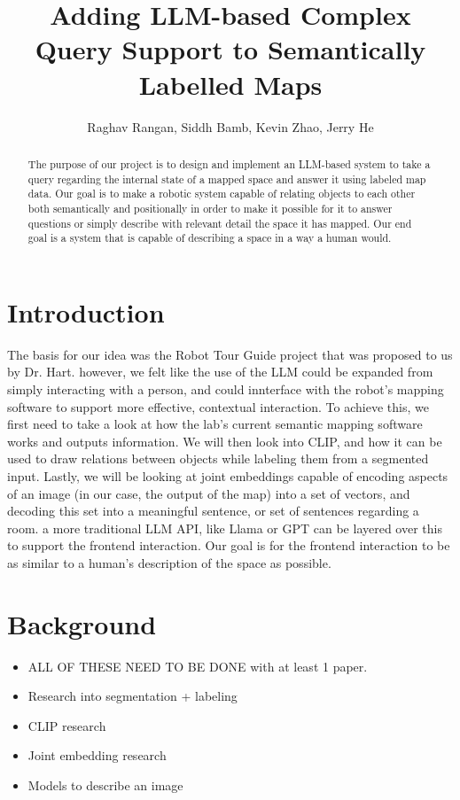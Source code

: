 \documentclass[letterpaper, 10 pt, conference]{ieeeconf}  %
\title{\LARGE \bf
Adding LLM-based Complex Query Support to Semantically Labelled Maps}
\author{Raghav Rangan, Siddh Bamb, Kevin Zhao, Jerry He%
}
\begin{document}
\maketitle
\thispagestyle{empty}
\pagestyle{empty}


\begin{abstract}
    The purpose of our project is to design and implement an LLM-based system to take a query regarding the internal state of a mapped space and answer it using labeled map data. Our goal is to make a robotic system capable of relating objects to each other both semantically and positionally in order to make it possible for it to answer questions or simply describe with relevant detail the space it has mapped. Our end goal is a system that is capable of describing a space in a way a human would.
\end{abstract}
    
\section{Introduction}
    The basis for our idea was the Robot Tour Guide project that was proposed to us by Dr. Hart. however, we felt like the use of the LLM could be expanded from simply interacting with a person, and could innterface with the robot's mapping software to support more effective, contextual interaction. To achieve this, we first need to take a look at how the lab's current semantic mapping software works and outputs information. We will then look into CLIP, and how it can be used to draw relations between objects while labeling them from a segmented input. Lastly, we will be looking at joint embeddings capable of encoding aspects of an image (in our case, the output of the map) into a set of vectors, and decoding this set into a meaningful sentence, or set of sentences regarding a room. a more traditional LLM API, like Llama or GPT can be layered over this to support the frontend interaction. Our goal is for the frontend interaction to be as similar to a human's description of the space as possible.

\section{Background}
\begin{itemize}
    \item ALL OF THESE NEED TO BE DONE with at least 1 paper.
    \item Research into segmentation + labeling
    \item CLIP research
    \item Joint embedding research
    \item Models to describe an image
\end{itemize}
\end{document}
